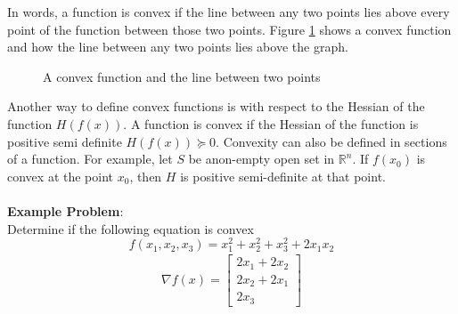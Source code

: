 In words, a function is convex if the line between any two points lies above every point of the function between those two points. Figure \ref{fig:convex_function} shows a convex function and how the line between any two points lies above the graph.
\begin{figure}[h]
  \centering
  \caption{A convex function and the line between two points}
  \label{fig:convex_function}
\end{figure}
Another way to define convex functions is with respect to the Hessian of the function $H(f(x))$. A function is convex if the Hessian of the function is positive semi definite $H(f(x)) \succeq 0$. Convexity can also be defined in sections of a function. For example, let $S$ be anon-empty open set in $\mathbb{R}^n$. If $f(x_0)$ is convex at the point $x_0$, then $H$ is positive semi-definite at that point.
\\ \\
\textbf{Example Problem}: 
\\
Determine if the following equation is convex
\begin{equation}
  f(x_1, x_2, x_3) = x_1^2 + x_2^2 + x_3^2 + 2x_1 x_2
\end{equation}
\begin{align}
  \nabla f(x) = 
  \begin{bmatrix}
     2 x_1 + 2x_2 \\
     2x_2 + 2x_1 \\
     2x_3
  \end{bmatrix}
\end{align}

